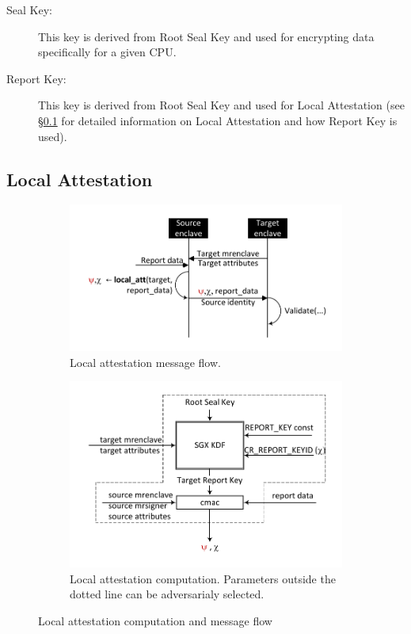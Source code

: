 \documentclass[10pt, letterpaper]{article}
\newcommand{\secref}[1]{\S\ref{#1}}
\begin{document}
\begin{description}
  \item[Seal Key:] This key is derived from Root Seal Key and used for
    encrypting data specifically for a given CPU.

  \item[Report Key:] This key is derived from Root Seal Key and used
    for Local Attestation (see \secref{ssec:localatt} for detailed
    information on Local Attestation and how Report Key is used).
  \end{description}

  \subsection{Local Attestation}
  \label{ssec:localatt}



  \begin{figure}
    \centering
    \begin{subfigure}[h]{.5\textwidth}
      \centering
      \includegraphics[width=.95\linewidth]{Diagrams/LocalAttestationFlow}
      \caption{Local attestation message flow.}
      \label{fig:localattestationflow}
    \end{subfigure}%
    \begin{subfigure}[h]{.5\textwidth}
      \centering
      \includegraphics[width=.85\linewidth]{Diagrams/LocalAttestation}
      \caption{Local attestation computation. Parameters outside the
        dotted line can be adversarialy selected.}
      \label{fig:localattestation}
    \end{subfigure}%
    \caption{Local attestation computation and message flow}
    \label{fig:localatt}
  \end{figure}
\end{document}
